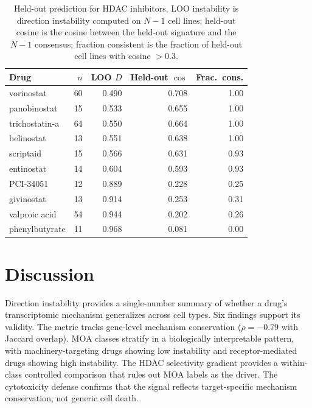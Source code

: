 \documentclass{article}
\begin{document}
\begin{table}[t]
\centering
\caption{Held-out prediction for HDAC inhibitors. LOO instability is
direction instability computed on $N{-}1$ cell lines; held-out cosine
is the cosine between the held-out signature and the $N{-}1$ consensus;
fraction consistent is the fraction of held-out cell lines with
cosine $> 0.3$.}
\label{tab:holdout}
\small
\begin{tabular}{lrrrr}
\toprule
Drug & $n$ & LOO $D$ & Held-out $\cos$ & Frac.\ cons. \\
\midrule
vorinostat & 60 & 0.490 & 0.708 & 1.00 \\
panobinostat & 15 & 0.533 & 0.655 & 1.00 \\
trichostatin-a & 64 & 0.550 & 0.664 & 1.00 \\
belinostat & 13 & 0.551 & 0.638 & 1.00 \\
scriptaid & 15 & 0.566 & 0.631 & 0.93 \\
entinostat & 14 & 0.604 & 0.593 & 0.93 \\
\midrule
PCI-34051 & 12 & 0.889 & 0.228 & 0.25 \\
givinostat & 13 & 0.914 & 0.253 & 0.31 \\
valproic acid & 54 & 0.944 & 0.202 & 0.26 \\
phenylbutyrate & 11 & 0.968 & 0.081 & 0.00 \\
\bottomrule
\end{tabular}
\end{table}

\section{Discussion}

Direction instability provides a single-number summary of whether a drug's
transcriptomic mechanism generalizes across cell types. Six findings
support its validity. The metric tracks gene-level mechanism conservation
($\rho = -0.79$ with Jaccard overlap). MOA classes stratify in a
biologically interpretable pattern, with machinery-targeting drugs
showing low instability and receptor-mediated drugs showing high
instability. The HDAC selectivity gradient provides a within-class
controlled comparison that rules out MOA labels as the driver. The
cytotoxicity defense confirms that the signal reflects target-specific
mechanism conservation, not generic cell death.
\end{document}
